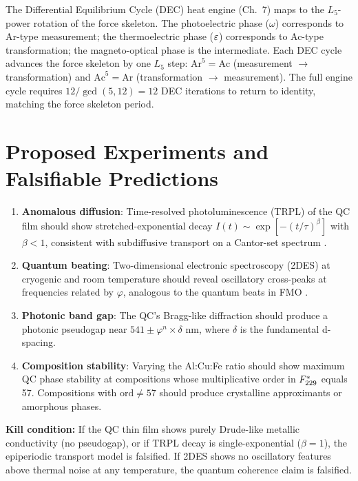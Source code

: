 \begin{remark}
The Differential Equilibrium Cycle (DEC) heat engine (Ch.~7) maps to the $L_5$-power rotation of the force skeleton. The photoelectric phase ($\omega$) corresponds to Ar-type measurement; the thermoelectric phase ($\varepsilon$) corresponds to Ac-type transformation; the magneto-optical phase is the intermediate. Each DEC cycle advances the force skeleton by one $L_5$ step: $\mathrm{Ar}^5 = \mathrm{Ac}$ (measurement $\to$ transformation) and $\mathrm{Ac}^5 = \mathrm{Ar}$ (transformation $\to$ measurement). The full engine cycle requires $12/\gcd(5, 12) = 12$ DEC iterations to return to identity, matching the force skeleton period.
\end{remark}

\section{Proposed Experiments and Falsifiable Predictions}

\begin{enumerate}
    \item \textbf{Anomalous diffusion}: Time-resolved photoluminescence (TRPL) of the QC film should show stretched-exponential decay $I(t) \sim \exp[-(t/\tau)^\beta]$ with $\beta < 1$, consistent with subdiffusive transport on a Cantor-set spectrum \cite{KohmotoKadanoffTang83}.
    
    \item \textbf{Quantum beating}: Two-dimensional electronic spectroscopy (2DES) at cryogenic and room temperature should reveal oscillatory cross-peaks at frequencies related by $\varphi$, analogous to the quantum beats in FMO \cite{EngelFleming07}.
    
    \item \textbf{Photonic band gap}: The QC's Bragg-like diffraction should produce a photonic pseudogap near $541 \pm \varphi^n \times \delta$ nm, where $\delta$ is the fundamental d-spacing.
    
    \item \textbf{Composition stability}: Varying the Al:Cu:Fe ratio should show maximum QC phase stability at compositions whose multiplicative order in $F_{229}^*$ equals 57. Compositions with $\text{ord} \neq 57$ should produce crystalline approximants or amorphous phases.
\end{enumerate}

\textbf{Kill condition:} If the QC thin film shows purely Drude-like metallic conductivity (no pseudogap), or if TRPL decay is single-exponential ($\beta = 1$), the epiperiodic transport model is falsified. If 2DES shows no oscillatory features above thermal noise at any temperature, the quantum coherence claim is falsified.

